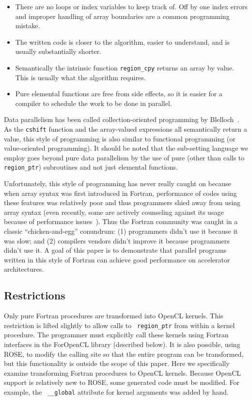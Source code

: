 \begin{itemize}
\item There are no loops or index variables to keep track of.  Off by
  one index errors and improper handling of array boundaries are a
  common programming mistake.
\item The written code is closer to the algorithm, easier to
  understand, and is usually substantially shorter.
\item Semantically the intrinsic function {\tt region\_cpy} returns an array by value.
  This is usually what the algorithm requires.
\item Pure elemental functions are free from side effects, so it is
  easier for a compiler to schedule the work to be done in parallel.
\end{itemize}

Data parallelism has been called collection-oriented programming by
Blelloch~\citep{blelloch90}.  As the {\tt cshift} function and the
array-valued expressions all semantically return a value, this style
of programming is also similar to functional programming (or
value-oriented programming).  It should be noted that the sub-setting
language we employ goes beyond pure data parallelism by the use of
pure (other than calls to {\tt region\_ptr}) subroutines and not just
elemental functions.

Unfortunately, this style of programming has never really caught on
because when array syntax was first introduced in Fortran, performance
of codes using these features was relatively poor and thus programmers
shied away from using array syntax (even recently, some are actively
counseling against its usage because of performance
issues~\citep{Levesque:SC08}).  Thus the Fortran community was caught
in a classic ``chicken-and-egg'' conundrum: (1) programmers didn't use
it because it was slow; and (2) compilers vendors didn't improve it
because programmers didn't use it.  A goal of this paper is to
demonstrate that parallel programs written in this style of Fortran
can achieve good performance on accelerator architectures.

\subsection{Restrictions}

Only pure Fortran procedures are transformed into OpenCL kernels.
This restriction is lifted slightly to allow calls to {\tt
  region\_ptr} from within a kernel procedure.  The programmer must
explicitly call these kernels using Fortran interfaces in the
ForOpenCL library (described below).  It is also possible, using ROSE,
to modify the calling site so that the entire program can be
transformed, but this functionality is outside the scope of this
paper.  Here we specifically examine transforming Fortran procedures
to OpenCL kernels.  Because OpenCL support is relatively new to ROSE,
some generated code must be modified.  For example, the {\tt
  \_\_global} attribute for kernel arguments was added by hand.

